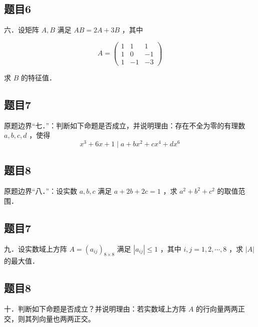 \documentclass{article}
\begin{document}
\subsection{题目6}
六．设矩阵 \(A, B\) 满足 \(A B=2 A+3 B\) ，其中

\[
A=\left(\begin{array}{ccc}
1 & 1 & 1 \\
1 & 0 & -1 \\
1 & -1 & -3
\end{array}\right)
\]

求 \(B\) 的特征值．

\begin{itemize}
\end{itemize}

\subsection{题目7}
原题边界“七．”：判断如下命题是否成立，并说明理由：存在不全为零的有理数 \(a, b, c, d\) ，使得
\[
x^{3}+6 x+1 \mid a+b x^{2}+c x^{4}+d x^{6}
\]

\subsection{题目8}
原题边界“八．”：设实数 \(a, b, c\) 满足 \(a+2 b+2 c=1\) ，求 \(a^{2}+b^{2}+c^{2}\) 的取值范围．

\subsection{题目7}
九．设实数域上方阵 \(A=\left(a_{i j}\right)_{8 \times 8}\) 满足 \(\left|a_{i j}\right| \leq 1\) ，其中 \(i, j=1,2, \cdots, 8\) ，求 \(|A|\) 的最大值．

\subsection{题目8}
十．判断如下命题是否成立？并说明理由：若实数域上方阵 \(A\) 的行向量两两正交，则其列向量也两两正交。
\end{document}
